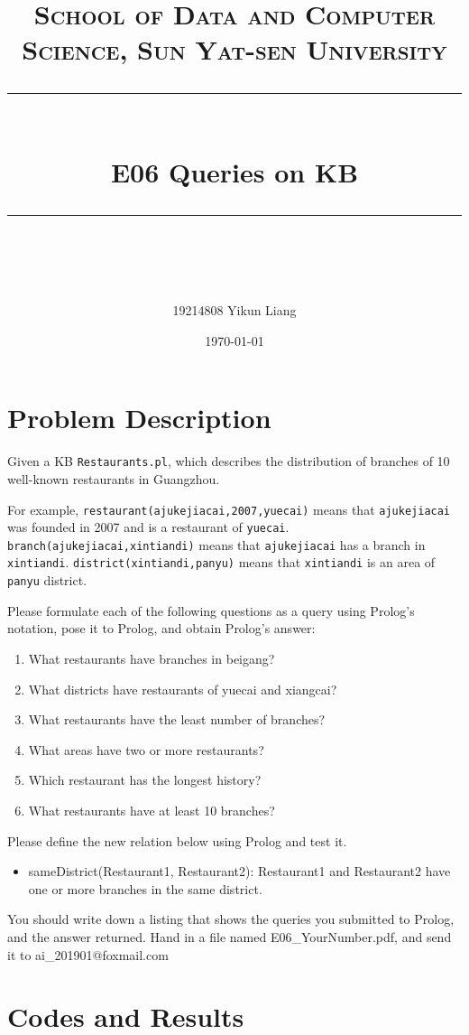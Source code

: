 ﻿\documentclass[a4paper, 11pt]{article}
\title{	
\normalfont \normalsize
\textsc{School of Data and Computer Science, Sun Yat-sen University} \\ [25pt] %
\rule{\textwidth}{0.5pt} \\[0.4cm] %
\huge  E06 Queries on KB \\ %
\rule{\textwidth}{2pt} \\[0.5cm] %
\author{19214808 Yikun Liang}
\date{\normalsize\today}
}
\begin{document}
\maketitle
\tableofcontents
\newpage


\section{Problem Description}
Given a KB \texttt{Restaurants.pl}, which describes the distribution of branches of 10 well-known restaurants in Guangzhou. 

For example, \texttt{restaurant(ajukejiacai,2007,yuecai)} means that \texttt{ajukejiacai} was founded in 2007 and is a restaurant of \texttt{yuecai}. \texttt{branch(ajukejiacai,xintiandi)} means that \texttt{ajukejiacai} has a branch in \texttt{xintiandi}. \texttt{district(xintiandi,panyu)} means that \texttt{xintiandi} is an area of \texttt{panyu} district.

Please formulate each of the following questions as a query using Prolog's notation, pose it to Prolog, and obtain Prolog's answer:
\begin{enumerate}
  \item What restaurants have branches in beigang? 
  \item What districts have restaurants of yuecai and xiangcai?
  \item What restaurants have the least number of branches?
  \item What areas have two or more restaurants?
\item Which restaurant has the longest history?
\item What restaurants have at least 10 branches?
\end{enumerate}
Please define the new relation below using Prolog and test it.
\begin{itemize}
\item sameDistrict(Restaurant1, Restaurant2): Restaurant1 and Restaurant2 have one or more branches in the same district.
\end{itemize}




You should write down a listing that shows the queries you submitted to Prolog, and the answer returned. Hand in a file named \textsf{E06\_YourNumber.pdf}, and send it to \textsf{ai\_201901@foxmail.com}


\section{Codes and Results}


%
%
\end{document}

